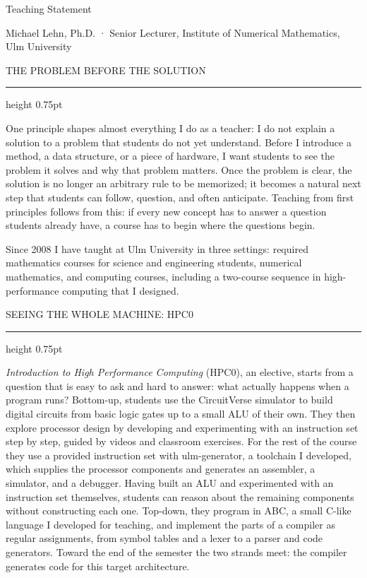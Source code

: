 \documentclass[10pt]{article}
\newcommand{\namesize}{\fontsize{16pt}{19.5pt}\selectfont}
\newcommand{\headsize}{\fontsize{10.5pt}{12.8pt}\selectfont}
\newcommand{\bodysize}{\fontsize{10.5pt}{13.6pt}\selectfont}
\newcommand{\cvsection}[1]{%
  \par\vspace{8pt}%
  {\headsize\bfseries\color{heading}\strut#1\par}%
  \nopagebreak\vspace{1pt}%
  {\color{rule}\hrule height 0.75pt}%
  \nopagebreak\vspace{3pt}%
  \prevdepth=2.9pt\relax
}
\begin{document}
\bodysize
\raggedright
{}
\frenchspacing
{}

{\centering
  {\namesize\bfseries\color{heading}\strut Teaching Statement\par}\vspace{2pt}
  {\headsize\color{tagline}Michael Lehn, Ph.D. · Senior Lecturer, Institute of Numerical Mathematics, Ulm University\par}
}

\cvsection{THE PROBLEM BEFORE THE SOLUTION}

One principle shapes almost everything I do as a teacher: I do not explain a solution to a problem that students do not yet understand. Before I introduce a method, a data structure, or a piece of hardware, I want students to see the problem it solves and why that problem matters. Once the problem is clear, the solution is no longer an arbitrary rule to be memorized; it becomes a natural next step that students can follow, question, and often anticipate. Teaching from first principles follows from this: if every new concept has to answer a question students already have, a course has to begin where the questions begin.

Since 2008 I have taught at Ulm University in three settings: required mathematics courses for science and engineering students, numerical mathematics, and computing courses, including a two-course sequence in high-performance computing that I designed.

\cvsection{SEEING THE WHOLE MACHINE: HPC0}

\emph{Introduction to High Performance Computing} (HPC0), an elective, starts from a question that is easy to ask and hard to answer: what actually happens when a program runs? Bottom-up, students use the CircuitVerse simulator to build digital circuits from basic logic gates up to a small ALU of their own. They then explore processor design by developing and experimenting with an instruction set step by step, guided by videos and classroom exercises. For the rest of the course they use a provided instruction set with ulm-generator, a toolchain I developed, which supplies the processor components and generates an assembler, a simulator, and a debugger. Having built an ALU and experimented with an instruction set themselves, students can reason about the remaining components without constructing each one. Top-down, they program in ABC, a small C-like language I developed for teaching, and implement the parts of a compiler as regular assignments, from symbol tables and a lexer to a parser and code generators. Toward the end of the semester the two strands meet: the compiler generates code for this target architecture.
\end{document}
